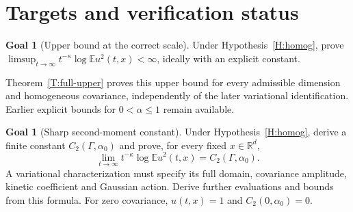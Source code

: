 \documentclass[12pt]{article}
\numberwithin{equation}{section}
\theoremstyle{definition}
\newtheorem{goal}[theorem]{Goal}
\newcommand{\R}{\mathbb{R}}
\newcommand{\E}{\mathbb{E}}
\begin{document}




























\section{Targets and verification status}\label{S:targets}

\begin{goal}[Upper bound at the correct scale]\label{G:upper}
  Under Hypothesis~\ref{H:homog}, prove
  $\limsup_{t\to\infty}t^{-\kappa}\log\E u^2(t,x)<\infty$, ideally with an
  explicit constant.
\end{goal}

Theorem~\ref{T:full-upper} proves this upper bound for every admissible
dimension and homogeneous covariance, independently of the later
variational identification. Earlier explicit bounds for
$0<\alpha\le1$ remain available.

\begin{goal}[Sharp second-moment constant]\label{G:sharp}
  Under Hypothesis~\ref{H:homog}, derive a finite constant
  $C_2(\Gamma,\alpha_0)$ and prove, for every fixed $x \in \R^d$,
  \[
    \lim_{t\to\infty}t^{-\kappa}\log\E u^2(t,x)
    = C_2(\Gamma,\alpha_0).
  \]
  A variational characterization must specify its full domain, covariance
  amplitude, kinetic coefficient and Gaussian action. Derive further
  evaluations and bounds from this formula. For zero covariance,
  $u(t,x) = 1$ and $C_2(0,\alpha_0) = 0$.
\end{goal}
\end{document}
